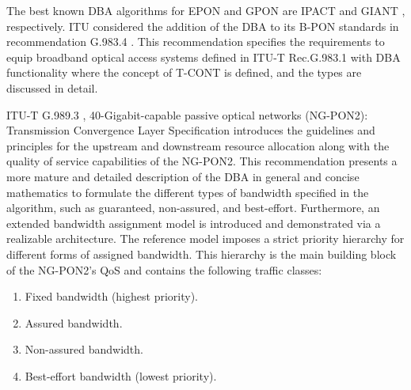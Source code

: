 
The best known \ac{DBA} algorithms for \ac{EPON} and \ac{GPON} are IPACT \cite{983911} and GIANT \cite{DAC:DAC761}, respectively. %
\ac{ITU} considered the addition of the \ac{DBA} to its B-PON standards in recommendation G.983.4 \cite{ITU_g.983.4_nodate}. This recommendation specifies the requirements to equip broadband optical access systems defined in ITU-T Rec.G.983.1 \cite{ITU_g.983.1_nodate} with \ac{DBA} functionality where the concept of \ac{T-CONT} is defined, and the types are discussed in detail.

ITU-T G.989.3 \cite{ITU_g.989.3_nodate}, 40-Gigabit-capable passive optical networks (\ac{NG-PON2}): Transmission Convergence Layer Specification introduces the guidelines and principles for the upstream and downstream resource allocation along with the quality of service capabilities of the \ac{NG-PON2}. This recommendation presents a more mature and detailed description of the \ac{DBA} in general and concise mathematics to formulate the different types of bandwidth specified in the algorithm, such as guaranteed, non-assured, and best-effort. Furthermore, an extended bandwidth assignment model is introduced and demonstrated via a realizable architecture. The reference model imposes a strict priority hierarchy for different forms of assigned bandwidth. This hierarchy is the main building block of the \ac{NG-PON2}'s \ac{QoS} and contains the following traffic classes:

\begin{enumerate}
\item Fixed bandwidth (highest priority).
\item Assured bandwidth.
\item Non-assured bandwidth.
\item Best-effort bandwidth (lowest priority).
\end{enumerate}

